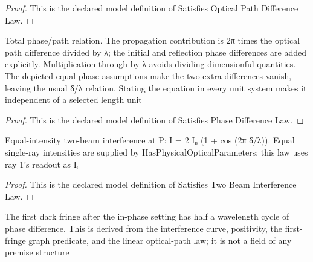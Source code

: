 \begin{proof}
  This is the declared model definition of Satisfies Optical Path Difference Law.
\end{proof}
\begin{definition}
  \label{def:physics:phyx-mini-0089:phyxminiproblems-problemphyxmini0089-satisfiesphasedifferencelaw}
  Total phase/path relation. The propagation contribution is 2π times the optical path difference divided by λ; the initial and reflection phase differences are added explicitly. Multiplication through by λ avoids dividing dimensionful quantities. The depicted equal-phase assumptions make the two extra differences vanish, leaving the usual δ/λ relation. Stating the equation in every unit system makes it independent of a selected length unit
\end{definition}
\begin{proof}
  This is the declared model definition of Satisfies Phase Difference Law.
\end{proof}
\begin{definition}
  \label{def:physics:phyx-mini-0089:phyxminiproblems-problemphyxmini0089-satisfiestwobeaminterferencelaw}
  Equal-intensity two-beam interference at P: I = 2 I₀ (1 + cos (2π δ/λ)). Equal single-ray intensities are supplied by HasPhysicalOpticalParameters; this law uses ray 1's readout as I₀
\end{definition}
\begin{proof}
  This is the declared model definition of Satisfies Two Beam Interference Law.
\end{proof}
\begin{lemma}
  \label{lem:physics:phyx-mini-0089:phyxminiproblems-problemphyxmini0089-phasedifference-at-firstdarkfringe}
  The first dark fringe after the in-phase setting has half a wavelength cycle of phase difference. This is derived from the interference curve, positivity, the first-fringe graph predicate, and the linear optical-path law; it is not a field of any premise structure
\end{lemma}
